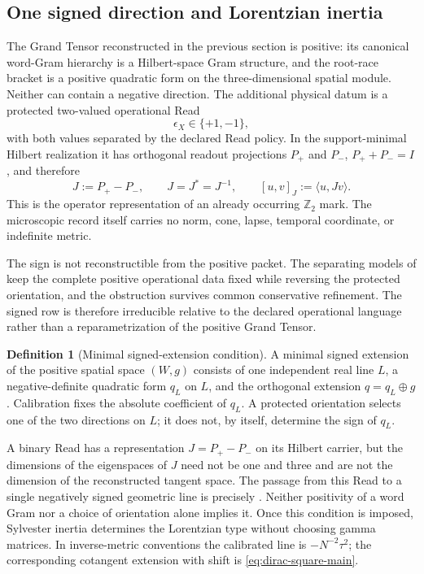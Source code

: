 \documentclass[11pt]{article}
\numberwithin{equation}{section}
\theoremstyle{definition}
\newtheorem{definition}[definition]{Definition}
\theoremstyle{remark}
\begin{document}
\subsection{One signed direction and Lorentzian inertia}

The Grand Tensor reconstructed in the previous section is positive: its
canonical word-Gram hierarchy is a Hilbert-space Gram structure, and the
root-race bracket is a positive quadratic form on the three-dimensional
spatial module.  Neither can contain a negative direction.  The additional
physical datum is a protected two-valued operational Read
\begin{equation}
 \epsilon_X\in\{+1,-1\},
 \label{eq:orientation-read-main}
\end{equation}
with both values separated by the declared Read policy.  In the support-minimal
Hilbert realization it has orthogonal readout projections $P_+$ and $P_-$,
$P_++P_-=I$, and therefore
\begin{equation}
 J:=P_+-P_-,\qquad J=J^*=J^{-1},
 \qquad [u,v]_J:=\langle u,Jv\rangle.
 \label{eq:krein-main}
\end{equation}
This is the operator representation of an already occurring $\mathbb Z_2$
mark.  The microscopic record itself carries no norm, cone, lapse, temporal
coordinate, or indefinite metric.

The sign is not reconstructible from the positive packet.  The separating
models of  keep the complete positive
operational data fixed while reversing the protected orientation, and the
obstruction survives common conservative refinement.  The signed row is
therefore irreducible relative to the declared operational language rather than
a reparametrization of the positive Grand Tensor.

\begin{definition}[Minimal signed-extension condition]
\label{def:main-signed-extension}
A minimal signed extension of the positive spatial space $(W,g)$ consists of
one independent real line $L$, a negative-definite quadratic form $q_L$ on
$L$, and the orthogonal extension $q=q_L\oplus g$. Calibration fixes the
absolute coefficient of $q_L$. A protected orientation selects one of the
two directions on $L$; it does not, by itself, determine the sign of $q_L$.
\end{definition}

A binary Read has a representation $J=P_+-P_-$ on its Hilbert carrier, but
the dimensions of the eigenspaces of $J$ need not be one and three and are
not the dimension of the reconstructed tangent space. The passage from this
Read to a single negatively signed geometric line is precisely
. Neither positivity of a word Gram nor a
choice of orientation alone implies it. Once this condition is imposed,
Sylvester inertia determines the Lorentzian type without choosing gamma
matrices. In inverse-metric conventions the calibrated line is
$-N^{-2}\tau^2$; the corresponding cotangent extension with shift is
\eqref{eq:dirac-square-main}.
\end{document}
